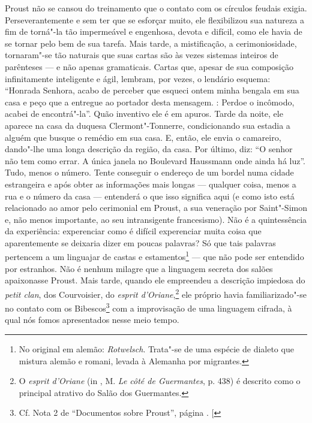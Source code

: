 Proust não se cansou do treinamento que o contato com os círculos
feudais exigia. Perseverantemente e sem ter que se esforçar muito, ele
flexibilizou sua natureza a fim de torná"-la tão impermeável e engenhosa,
devota e difícil, como ele havia de se tornar pelo bem de sua tarefa.
Mais tarde, a mistificação, a cerimoniosidade, tornaram"-se tão
naturais que suas cartas são às vezes sistemas inteiros de parênteses ---
e não apenas gramaticais. Cartas que, apesar de sua composição
infinitamente inteligente e ágil, lembram, por vezes, o lendário
esquema: ``Honrada Senhora, acabo de perceber que esqueci ontem minha
bengala em sua casa e peço que a entregue ao portador desta mensagem.
: Perdoe o incômodo, acabei de encontrá"-la''. Quão inventivo ele é
em apuros. Tarde da noite, ele aparece na casa da duquesa
Clermont"-Tonnerre, condicionando sua estadia a alguém que busque o
remédio em sua casa. E, então, ele envia o camareiro, dando"-lhe uma
longa descrição da região, da casa. Por último, diz: ``O senhor não tem
como errar. A única janela no Boulevard Haussmann onde ainda há luz''.
Tudo, menos o número. Tente conseguir o endereço de um bordel numa
cidade estrangeira e após obter as informações mais longas --- qualquer
coisa, menos a rua e o número da casa --- entenderá o que isso significa
aqui (e como isto está relacionado ao amor pelo cerimonial em Proust, a
sua veneração por Saint"-Simon e, não menos importante, ao seu
intransigente francesismo). Não é a quintessência da experiência:
experenciar como é difícil experenciar muita coisa que aparentemente
se deixaria dizer em poucas palavras? Só que tais palavras pertencem a
um linguajar de castas e estamentos\footnote{No original em alemão:
  \emph{Rotwelsch}. Trata"-se de uma espécie de dialeto que mistura
  alemão e romani, levada à Alemanha por migrantes. \versal{[N. T.]}} --- que não pode ser
entendido por estranhos. Não é nenhum milagre que a linguagem secreta
dos salões apaixonasse Proust. Mais tarde, quando ele empreendeu a
descrição impiedosa do \emph{petit clan}, dos Courvoisier, do
\emph{esprit d'Oriane},\footnote{O \emph{esprit d'Oriane} (in ,
  M. \emph{Le côté de Guermantes}, p. 438) é descrito como o principal
  atrativo do Salão dos Guermantes. \versal{[N. E.]}} ele próprio havia familiarizado"-se
no contato com os Bibescos\footnote{Cf. Nota 2 de ``Documentos sobre Proust'', página \pageref{bibescos}. {[}\versal{N. E.}{]}} com a improvisação de uma linguagem cifrada,
à qual nós fomos apresentados nesse meio tempo.

